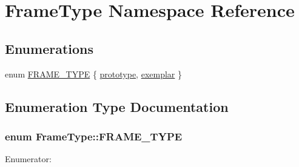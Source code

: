 \hypertarget{namespace_frame_type}{
\section{FrameType Namespace Reference}
\label{namespace_frame_type}
}
\subsection*{Enumerations}
\begin{DoxyCompactItemize}
\item 
enum \hyperlink{namespace_frame_type_aa380b02be71bbce421af299f6025b6a4}{FRAME\_\-TYPE} \{ \hyperlink{namespace_frame_type_aa380b02be71bbce421af299f6025b6a4ad3c3f3595a925052ff2f659a9405d690}{prototype}, 
\hyperlink{namespace_frame_type_aa380b02be71bbce421af299f6025b6a4aaff0e65302127033cf66feca5a462f5f}{exemplar}
 \}
\end{DoxyCompactItemize}


\subsection{Enumeration Type Documentation}
\hypertarget{namespace_frame_type_aa380b02be71bbce421af299f6025b6a4}{
\subsubsection[{FRAME\_\-TYPE}]{\setlength{\rightskip}{0pt plus 5cm}enum {\bf FrameType::FRAME\_\-TYPE}}}
\label{namespace_frame_type_aa380b02be71bbce421af299f6025b6a4}
\begin{Desc}
\item[Enumerator: ]\par
\begin{description}
\item[{\em 
\hypertarget{namespace_frame_type_aa380b02be71bbce421af299f6025b6a4ad3c3f3595a925052ff2f659a9405d690}{
prototype}
\label{namespace_frame_type_aa380b02be71bbce421af299f6025b6a4ad3c3f3595a925052ff2f659a9405d690}
}]\item[{\em 
\hypertarget{namespace_frame_type_aa380b02be71bbce421af299f6025b6a4aaff0e65302127033cf66feca5a462f5f}{
exemplar}
\label{namespace_frame_type_aa380b02be71bbce421af299f6025b6a4aaff0e65302127033cf66feca5a462f5f}
}]\end{description}
\end{Desc}

